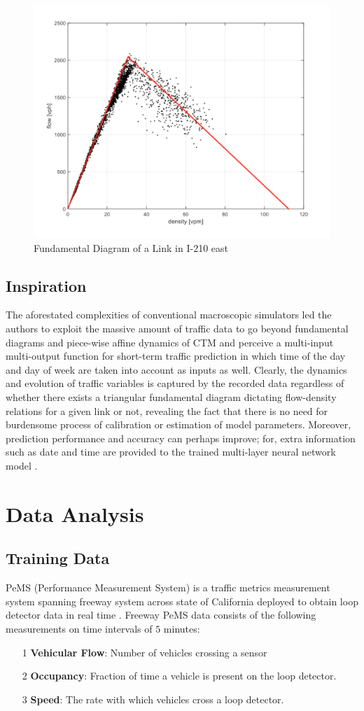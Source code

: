 \documentclass[twocolumn,10pt]{asme2e}
\begin{document}
\begin{figure}[h]
    \centering
    \includegraphics[width=0.8\linewidth]{fd.png}
    \caption{Fundamental Diagram of a Link in I-210 east}
    \label{fig:fd}
\end{figure} 
\subsection{Inspiration}
The aforestated complexities of conventional macroscopic simulators led the authors to exploit the massive amount of traffic data to go beyond fundamental diagrams and piece-wise affine dynamics of CTM and perceive a multi-input multi-output function for short-term traffic prediction in which time of the day and day of week are taken into account as inputs as well. Clearly, the dynamics and evolution of traffic variables is captured by the recorded data regardless of whether there exists a triangular fundamental diagram dictating flow-density relations for a given link or not, revealing the fact that there is no need for burdensome process of calibration or estimation of model parameters. Moreover, prediction performance and accuracy can perhaps improve; for, extra information such as date and time are provided to the trained multi-layer neural network model \cite{neuralForcast}.  


\section{Data Analysis}
\subsection{Training Data} 
PeMS (Performance Measurement System) is a traffic metrics measurement system spanning freeway system across state of California deployed to obtain loop detector data in real time \cite{PemsPravin}. Freeway PeMS data consists of the following measurements on time intervals of $5$ minutes:
\begin{itemize}
\item[1]\textbf{Vehicular Flow}: Number of vehicles crossing a sensor 
\item[2]\textbf{Occupancy}: Fraction of time a vehicle is present on the loop detector\cite{occupancy}.
\item[3]\textbf{Speed}: The rate with which vehicles cross a loop detector.

\end{itemize}
\end{document}
